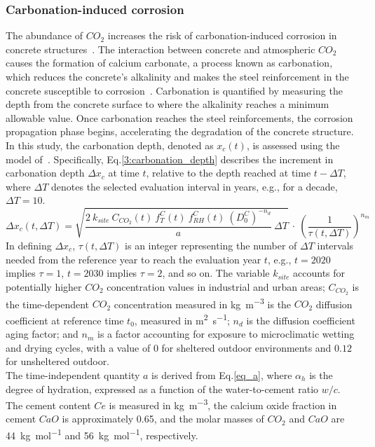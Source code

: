 \subsubsection{Carbonation-induced corrosion}\label{Carbonation_corrosion_Chpt}
The abundance of $CO_2$ increases the risk of carbonation-induced corrosion in concrete structures~\cite{TALUKDAR_part1,TALUKDAR_part2}. 
The interaction between concrete and atmospheric $CO_2$ causes the formation of calcium carbonate, a process known as carbonation, which reduces the concrete's alkalinity and makes the steel reinforcement in the concrete susceptible to corrosion~\cite{GLASSER2008226}.
Carbonation is quantified by measuring the depth from the concrete surface to where the alkalinity reaches a minimum allowable value. 
Once carbonation reaches the steel reinforcements, the corrosion propagation phase begins, accelerating the degradation of the concrete structure.
In this study, the carbonation depth, denoted as $x_c(t)$, is assessed using the model of~\textcite{Carb_eq_STEWART,Carb_eq_BASTIDASARTEAGA}.
Specifically, Eq.\ref{3:carbonation_depth} describes the increment in carbonation depth $\Delta x_c$ at time $t$, relative to the depth reached at time $t-\Delta T$, where $\Delta T$ denotes the selected evaluation interval in years, e.g., for a decade, $\Delta T = 10$.
\begin{equation}
    \label{3:carbonation_depth}
    \Delta x_c(t, \Delta T) = \sqrt{\frac{2 \ k_{site} \ C_{CO_2}(t) \ f_T^C(t) \ f_{RH}^C(t) \ (D_0^C)^{-n_d}}{a} \ \Delta T} \ \cdot \ \left( \frac{1}{\tau (t, \Delta T)} \right)^{n_m} 
\end{equation}
In defining $\Delta x_c$, $\tau (t, \Delta T)$ is an integer representing the number of $\Delta T$ intervals needed from the reference year to reach the evaluation year $t$, e.g., $t = 2020$ implies $\tau = 1$, $t = 2030$ implies $\tau = 2$, and so on.
The variable $k_{site}$ accounts for potentially higher $CO_2$ concentration values in industrial and urban areas; $C_{CO_2}$ is the time-dependent $CO_2$ concentration measured in \si{\kilogram\per\cubic\meter} is the $CO_2$ diffusion coefficient at reference time $t_0$, measured in \si{\square\meter\per\second}; $n_d$ is the diffusion coefficient aging factor; and $n_m$ is a factor accounting for exposure to microclimatic wetting and drying cycles, with a value of $0$ for sheltered outdoor environments and $0.12$ for unsheltered outdoor. \\
The time-independent quantity $a$ is derived from Eq.\ref{eq_a}, where $\alpha_h$ is the degree of hydration, expressed as a function of the water-to-cement ratio $w / c$. The cement content $Ce$ is measured in \si{\kilogram\per\cubic\meter}, the calcium oxide fraction in cement $CaO$ is approximately 0.65, and the molar masses of $CO_2$ and $CaO$ are \SI{44}{\kilogram\per\mole} and \SI{56}{\kilogram\per\mole}, respectively.
